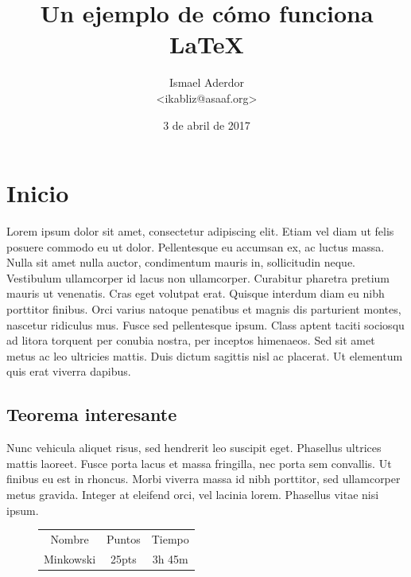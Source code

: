 \documentclass[a4paper]{article}
\title{Un ejemplo de cómo funciona \LaTeX}
\author{Ismael Aderdor \\ <ikabliz@asaaf.org>}
\date{3 de abril de 2017}
\begin{document}
\maketitle

\tableofcontents



\section{Inicio}
\label{Sec:inicio}	%


Lorem ipsum dolor sit amet, consectetur adipiscing elit. Etiam vel diam ut felis posuere commodo eu ut dolor. Pellentesque eu accumsan ex, ac luctus massa. Nulla sit amet nulla auctor, condimentum mauris in, sollicitudin neque. Vestibulum ullamcorper id lacus non ullamcorper. Curabitur pharetra pretium mauris ut venenatis. Cras eget volutpat erat. Quisque interdum diam eu nibh porttitor finibus. Orci varius natoque penatibus et magnis dis parturient montes, nascetur ridiculus mus. Fusce sed pellentesque ipsum. Class aptent taciti sociosqu ad litora torquent per conubia nostra, per inceptos himenaeos. Sed sit amet metus ac leo ultricies mattis. Duis dictum sagittis nisl ac placerat. Ut elementum quis erat viverra dapibus.



\subsection{Teorema interesante}


Nunc vehicula aliquet risus, sed hendrerit leo suscipit eget. Phasellus ultrices mattis laoreet. Fusce porta lacus et massa fringilla, nec porta sem convallis. Ut finibus eu est in rhoncus. Morbi viverra massa id nibh porttitor, sed ullamcorper metus gravida. Integer at eleifend orci, vel lacinia lorem. Phasellus vitae nisi ipsum.


\begin{figure}[H]
	\centering
	\begin{tabular}{ccc}
	Nombre & Puntos & Tiempo \\ 
	Minkowski & 25pts & 3h 45m 
	\end{tabular}
\end{figure}
\end{document}
